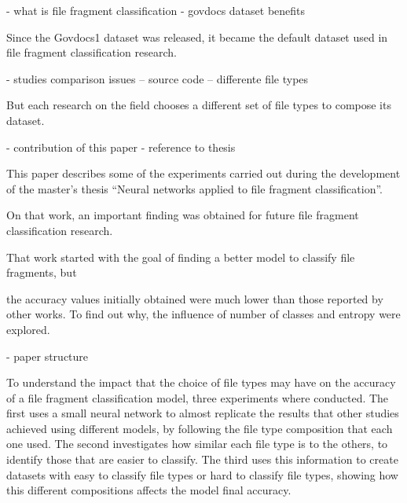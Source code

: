 - what is file fragment classification
- govdocs dataset benefits

Since the Govdocs1 dataset \cite{garfinkel_bringing_2009} was released, it became the default dataset used in file fragment classification research.

- studies comparison issues
-- source code
-- differente file types

But each research on the field chooses a different set of file types to compose its dataset. 

- contribution of this paper
- reference to thesis

This paper describes some of the experiments carried out during the development of the master's thesis ``Neural networks applied to file fragment classification''\cite{romero_atila_leites_neural_2020}. 

On that work, an important finding was obtained for future file fragment classification research.

That work started with the goal of finding a better model to classify file fragments, but 

the accuracy values initially obtained were much lower than those reported by other works. To find out why, 
the influence of number of classes and entropy were explored. 

- paper structure


To understand the impact that the choice of file types may have on the accuracy of a file fragment classification model, three experiments where conducted. The first uses a small neural network to almost replicate the results that other studies achieved using different models, by following the file type composition that each one used. The second investigates how similar each file type is to the others, to identify those that are easier to classify. The third uses this information to create datasets with easy to classify file types or hard to classify file types, showing how this different compositions affects the model final accuracy.